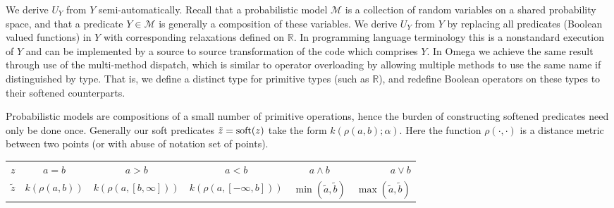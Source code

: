 We derive $U_Y$ from $Y$ semi-automatically. 
Recall that a probabilistic model $\mathcal{M}$ is a collection of random variables on a shared probability space, and that a predicate $Y \in \mathcal{M}$ is generally a composition of these variables.
We derive $U_Y$ from $Y$ by replacing all predicates (Boolean valued functions) in $Y$ with corresponding relaxations defined on $\mathbb{R}$.
In programming language terminology this is a nonstandard execution of $Y$ and can be implemented by a source to source transformation of the code which comprises $Y$.
In Omega we achieve the same result through use of the multi-method dispatch, which is similar to operator overloading by allowing multiple methods to use the same name if distinguished by type.  That is, we define a distinct type for primitive types (such as $\mathbb{R}$), and redefine Boolean operators on these types to their softened counterparts.

Probabilistic models are compositions of a small number of primitive operations, hence the burden of constructing softened predicates need only be done once.
Generally our soft predicates $\tilde{z} = \operatorname{soft}(z)$ take the form $k(\rho(a, b); \alpha)$.
Here the function $\rho(\cdot, \cdot)$ is a distance metric between two points (or with abuse of notation set of points).

\begin{center}
\begin{tabular}{ l | c | c | c | c |r }
  \hline		
  $z$ & $a = b$ & $a > b$ & $a < b$ & $a \land b$ & $a \lor b$  \\
  $\tilde{z}$ & $k(\rho(a, b))$ & $k(\rho(a, [b, \infty]))$ & $k(\rho(a, [-\infty, b]))$ & $\min(\tilde{a}, \tilde{b})$ & $\max(\tilde{a}, \tilde{b})$\\
  \hline  
\end{tabular}
\end{center}



